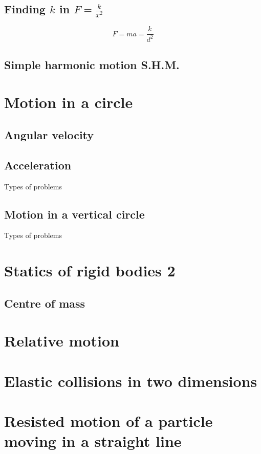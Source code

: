 \documentclass[a4paper]{article}
\begin{document}
\subsection{Finding $k$ in $F=\frac{k}{x^2}$}
\[
    F=ma=\frac{k}{d^2}
\]

\subsection{Simple harmonic motion S.H.M.}

\section{Motion in a circle}
\subsection{Angular velocity}

\subsection{Acceleration}

Types of problems

\subsection{Motion in a vertical circle}

Types of problems
\section{Statics of rigid bodies 2}
\subsection{Centre of mass}
\section{Relative motion}

\section{Elastic collisions in two dimensions}

\section{Resisted motion of a particle moving in a straight line}
\end{document}
